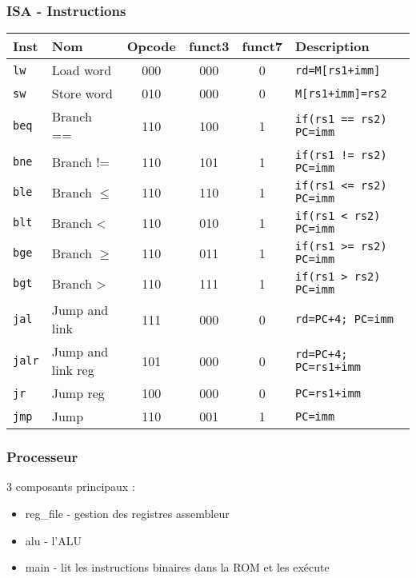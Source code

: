 \documentclass[xcolor=pst,10pt,onlymath]{beamer}
\begin{document}
\begin{frame}
    \frametitle{ISA - Instructions}
    \begin{longtable}{|l|l|c|c|c|l|}
        \hline
        Inst           & Nom                             & Opcode & funct3 & funct7 & Description                   \\
        \hline
        \texttt{lw}    & Load word                       & 000    & 000    & 0      & \texttt{rd=M[rs1+imm]}        \\
        \texttt{sw}    & Store word                      & 010    & 000    & 0      & \texttt{M[rs1+imm]=rs2}       \\
        \hline
        \texttt{beq}   & Branch ==                       & 110    & 100    & 1      & \texttt{if(rs1 == rs2) PC=imm}\\
        \texttt{bne}   & Branch !=                       & 110    & 101    & 1      & \texttt{if(rs1 != rs2) PC=imm}\\
        \texttt{ble}   & Branch \(\leqslant\)            & 110    & 110    & 1      & \texttt{if(rs1 <= rs2) PC=imm}\\
        \texttt{blt}   & Branch <                        & 110    & 010    & 1      & \texttt{if(rs1 < rs2) PC=imm} \\
        \texttt{bge}   & Branch \(\geqslant\)            & 110    & 011    & 1      & \texttt{if(rs1 >= rs2) PC=imm}\\
        \texttt{bgt}   & Branch >                        & 110    & 111    & 1      & \texttt{if(rs1 > rs2) PC=imm} \\
        \hline
        \texttt{jal}   & Jump and link                   & 111    & 000    & 0      &\texttt{rd=PC+4; PC=imm}       \\
        \texttt{jalr}  & Jump and link reg               & 101    & 000    & 0      &\texttt{rd=PC+4; PC=rs1+imm}   \\
        \texttt{jr}    & Jump reg                        & 100    & 000    & 0      &\texttt{PC=rs1+imm}            \\
        \texttt{jmp}   & Jump                            & 110    & 001    & 1      &\texttt{PC=imm}                \\
        \hline
    \end{longtable}
\end{frame}

\Large
\begin{frame}
    \frametitle{Processeur}
    3 composants principaux :
    \begin{itemize}
        \item reg_file - gestion des registres assembleur
        \item alu - l'ALU
        \item main - lit les instructions binaires dans la ROM et les exécute
    \end{itemize}
\end{frame}
\end{document}
